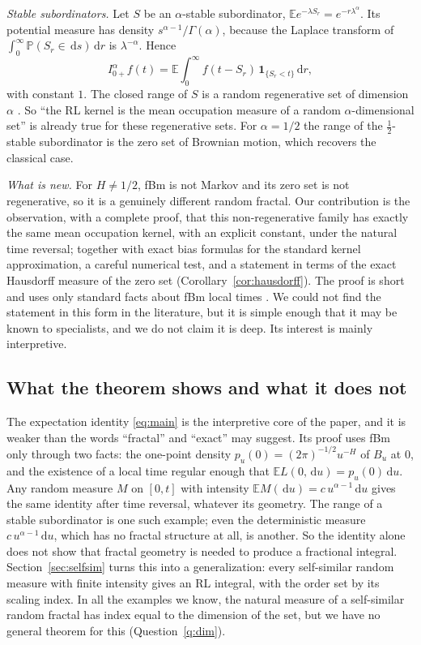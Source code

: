 \documentclass[11pt]{article}
\theoremstyle{remark}
\theoremstyle{definition}
\newcommand{\E}{\mathbb{E}}
\newcommand{\Prob}{\mathbb{P}}
\newcommand{\dd}{\,\mathrm{d}}
\newcommand{\Ia}{I^{\alpha}_{0+}}
\begin{document}
\emph{Stable subordinators.} Let $S$ be an $\alpha$-stable subordinator, $\E e^{-\lambda S_r}=e^{-r\lambda^\alpha}$. Its potential measure has density $s^{\alpha-1}/\Gamma(\alpha)$, because the Laplace transform of $\int_0^\infty\Prob(S_r\in\dd s)\dd r$ is $\lambda^{-\alpha}$. Hence
\[
\Ia f(t)=\E\int_0^\infty f(t-S_r)\,\mathbf 1_{\{S_r<t\}}\dd r ,
\]
with constant $1$. The closed range of $S$ is a random regenerative set of dimension $\alpha$ \cite{Ber96,Ber99,MS12}. So ``the RL kernel is the mean occupation measure of a random $\alpha$-dimensional set'' is already true for these regenerative sets. For $\alpha=1/2$ the range of the $\tfrac12$-stable subordinator is the zero set of Brownian motion, which recovers the classical case.

\emph{What is new.} For $H\neq1/2$, fBm is not Markov and its zero set is not regenerative, so it is a genuinely different random fractal. Our contribution is the observation, with a complete proof, that this non-regenerative family has exactly the same mean occupation kernel, with an explicit constant, under the natural time reversal; together with exact bias formulas for the standard kernel approximation, a careful numerical test, and a statement in terms of the exact Hausdorff measure of the zero set (Corollary~\ref{cor:hausdorff}). The proof is short and uses only standard facts about fBm local times \cite{Ber69,Ber73,GH80,Pit78,Xia97}. We could not find the statement in this form in the literature, but it is simple enough that it may be known to specialists, and we do not claim it is deep. Its interest is mainly interpretive.

\subsection{What the theorem shows and what it does not}\label{sec:shows}
The expectation identity \eqref{eq:main} is the interpretive core of the paper, and it is weaker than the words ``fractal'' and ``exact'' may suggest. Its proof uses fBm only through two facts: the one-point density $p_u(0)=(2\pi)^{-1/2}u^{-H}$ of $B_u$ at $0$, and the existence of a local time regular enough that $\E L(0,\dd u)=p_u(0)\dd u$. Any random measure $M$ on $[0,t]$ with intensity $\E M(\dd u)=c\,u^{\alpha-1}\dd u$ gives the same identity after time reversal, whatever its geometry. The range of a stable subordinator is one such example; even the deterministic measure $c\,u^{\alpha-1}\dd u$, which has no fractal structure at all, is another. So the identity alone does not show that fractal geometry is needed to produce a fractional integral. Section~\ref{sec:selfsim} turns this into a generalization: every self-similar random measure with finite intensity gives an RL integral, with the order set by its scaling index. In all the examples we know, the natural measure of a self-similar random fractal has index equal to the dimension of the set, but we have no general theorem for this (Question~\ref{q:dim}).
\end{document}
